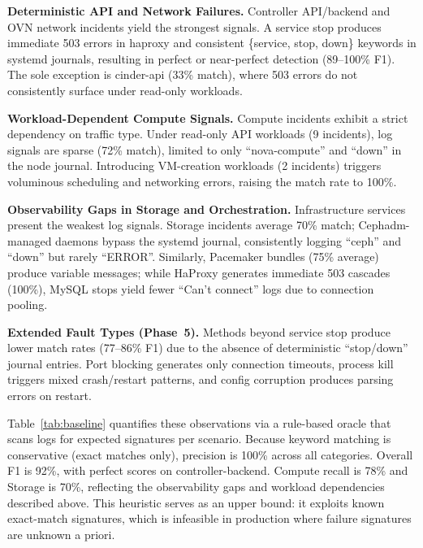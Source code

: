 \documentclass[sigconf,review]{acmart}
\begin{document}
\textbf{Deterministic API and Network Failures.} Controller API/back\-end and OVN network incidents yield the strongest signals. A service stop produces immediate 503 errors in haproxy and consistent \{service, stop, down\} keywords in systemd journals, resulting in perfect or near-perfect detection (89--100\% F1). The sole exception is cinder-api (33\% match), where 503 errors do not consistently surface under read-only workloads.

\textbf{Workload-Dependent Compute Signals.} Compute incidents exhibit a strict dependency on traffic type. Under read-only API workloads (9 incidents), log signals are sparse (72\% match), limited to only ``nova-compute'' and ``down'' in the node journal. Introducing VM-creation workloads (2 incidents) triggers voluminous scheduling and networking errors, raising the match rate to 100\%.

\textbf{Observability Gaps in Storage and Orchestration.} Infrastructure services present the weakest log signals. Storage incidents average 70\% match; Cephadm-managed daemons bypass the systemd journal, consistently logging ``ceph'' and ``down'' but rarely ``ERROR''. Similarly, Pacemaker bundles (75\% average) produce variable messages; while HaProxy generates immediate 503 cascades (100\%), MySQL stops yield fewer ``Can't connect'' logs due to connection pooling.

\textbf{Extended Fault Types (Phase~5).} Methods beyond service stop produce lower match rates (77--86\% F1) due to the absence of deterministic ``stop/down'' journal entries. Port blocking generates only connection timeouts, process kill triggers mixed crash/restart patterns, and config corruption produces parsing errors on restart.

Table~\ref{tab:baseline} quantifies these observations via a rule-based oracle that scans logs for expected signatures per scenario. Because keyword matching is conservative (exact matches only), precision is 100\% across all categories. Overall F1 is 92\%, with perfect scores on controller-backend. Compute recall is 78\% and Storage is 70\%, reflecting the observability gaps and workload dependencies described above. This heuristic serves as an upper bound: it exploits known exact-match signatures, which is infeasible in production where failure signatures are unknown a priori.
\end{document}
